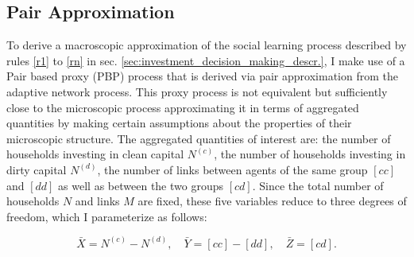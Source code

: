 \subsection{Pair Approximation}
\label{sec:pair_approximation}
To derive a macroscopic approximation of the social learning process described by rules \ref{r1} to \ref{rn} in sec. \ref{sec:investment_decision_making_descr.}, I make use of a Pair based proxy (PBP) process that is derived via pair approximation from the adaptive network process. This proxy process is not equivalent but sufficiently close to the microscopic process approximating it in terms of aggregated quantities by making certain assumptions about the properties of their microscopic structure. The aggregated quantities of interest are: the number of households investing in clean capital $N^{(c)}$, the number of households investing in dirty capital $N^{(d)}$, the number of links between agents of the same group $[cc]$ and $[dd]$ as well as between the two groups $[cd]$. Since the total number of households $N$ and links $M$ are fixed, these five variables reduce to three degrees of freedom, which I parameterize as follows:

\begin{equation}
	\bar{X} = N^{(c)} - N^{(d)}, \quad \bar{Y} = [cc] - [dd], \quad \bar{Z} = [cd].
	\label{eq:opinion_formation_macro_variables}
\end{equation}

